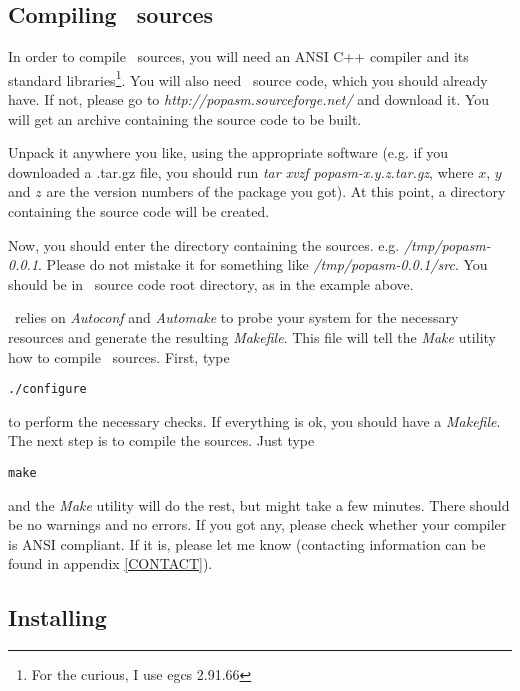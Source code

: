 \documentclass[a4paper,draft,12pt]{book}
\begin{document}
\subsection{Compiling \popasm\ sources\label{COMPUNIX}}
In order to compile \popasm\ sources, you will need an ANSI C++
compiler and its standard libraries\footnote{For the curious, I
use egcs 2.91.66}. You will also need \popasm\ source code, which
you should already have. If not, please go to
\emph{http://popasm.sourceforge.net/} and download it. You will
get an archive containing the source code to be built.

Unpack it anywhere you like, using the appropriate software (e.g.
if you downloaded a .tar.gz file, you should run
\emph{tar xvzf popasm-x.y.z.tar.gz}, where $x$, $y$ and $z$ are
the version numbers of the package you got). At this point, a
directory containing the source code will be created.

Now, you should enter the directory containing the sources. e.g.
\emph{/tmp/popasm-0.0.1}. Please do not mistake it for something
like \emph{/tmp/popasm-0.0.1/src}. You should be in \popasm\ 
source code root directory, as in the example above.

\popasm\ relies on \emph{Autoconf}\cite{AUTOCONF} and
\emph{Automake}\cite{AUTOMAKE} to probe your system for the
necessary resources and generate the resulting \emph{Makefile}.
This file will tell the \emph{Make}\cite{MAKE} utility how to
compile \popasm\ sources. First, type

\begin{verbatim}
./configure
\end{verbatim}

to perform the necessary checks. If everything is ok, you should have a
\emph{Makefile}. The next step is to compile the sources. Just type

\begin{verbatim}
make
\end{verbatim}

and the \emph{Make} utility will do the rest, but might take a few
minutes. There should be no warnings and no errors. If you got any,
please check whether your compiler is ANSI compliant. If it is,
please let me know (contacting information can be found in appendix
\ref{CONTACT}).

\subsection{Installing \popasm}
\end{document}
